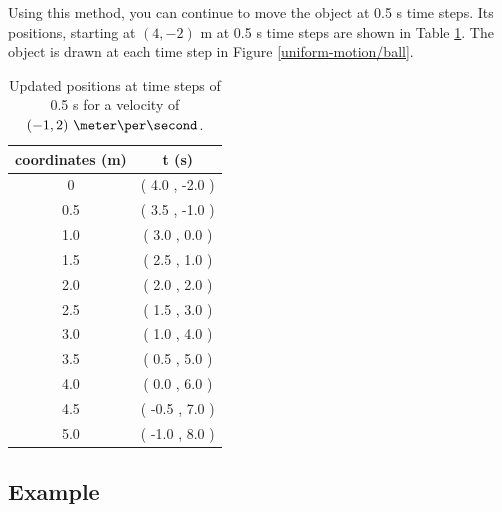 Using this method, you can continue to move the object at 0.5 s time steps. Its positions, starting at $(4,-2)$ m at 0.5 s time steps are shown in Table \ref{uniform-motion/ball-table}. The object is drawn at each time step in Figure \ref{uniform-motion/ball}.


\newpage


\begin{table}[htdp]
\caption{Updated positions at time steps of 0.5 s for a velocity of $(-1,2)\ \meter \per \second$.}
\begin{center}
\begin{tabular}{|c|c|}
\hline
coordinates (m) & t (s) \\
\hline
\hline 
  0  & ( 4.0 , -2.0 )  \\
\hline 
  0.5  & ( 3.5 , -1.0 )  \\
\hline 
  1.0  & ( 3.0 , 0.0 )  \\
\hline 
  1.5  & ( 2.5 , 1.0 )  \\
\hline 
  2.0  & ( 2.0 , 2.0 )  \\
\hline 
  2.5  & ( 1.5 , 3.0 )  \\
\hline 
  3.0  & ( 1.0 , 4.0 )  \\
\hline 
  3.5  & ( 0.5 , 5.0 )  \\
\hline 
  4.0  & ( 0.0 , 6.0 )  \\
\hline 
  4.5  & ( -0.5 , 7.0 )  \\
\hline 
  5.0  & ( -1.0 , 8.0 )  \\
\hline
\hline
\end{tabular}
\end{center}
\label{uniform-motion/ball-table}
\end{table}%

\newpage

\subsection*{Example}

